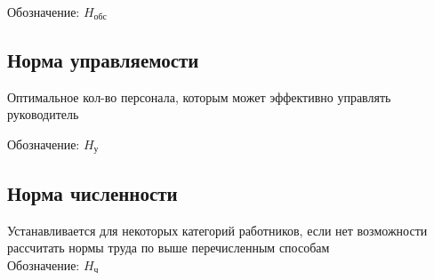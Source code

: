 \documentclass[11pt]{article}
\begin{document}
Обозначение: \(H_{\text{обс}}\)

\subsection{Норма управляемости}
\label{sec:org0d2c918}

Оптимальное кол-во персонала, которым может эффективно управлять руководитель

Обозначение: \(H_{\text{у}}\)

\subsection{Норма численности}
\label{sec:orgc88c536}

Устанавливается для некоторых категорий работников, если нет возможности рассчитать нормы труда по выше перечисленным способам \\

Обозначение: \(H_{\text{ч}}\)
\end{document}
